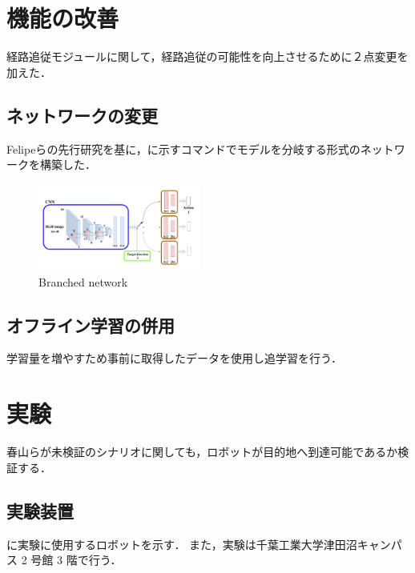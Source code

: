 \documentclass[10pt]{jarticle}
\begin{document}
    \section{機能の改善}%
    経路追従モジュールに関して，経路追従の可能性を向上させるために２点変更を加えた．
    \subsection{ネットワークの変更}
    Felipeら\cite{Codevilla2018}の先行研究を基に，に示すコマンドでモデルを分岐する形式のネットワークを構築した．
    \vspace{-2zh}
    \begin{center}
        \begin{figure}[h]
            \includegraphics[width=0.475\textwidth]{./fig/ishiguro/branched.pdf}
            \vspace{-2zh}
            \caption{Branched network}
            \label{fig:branched}
        \end{figure}
    \end{center}
    \vspace{-2zh}
    \subsection{オフライン学習の併用}
    学習量を増やすため事前に取得したデータを使用し追学習を行う．

    \section{実験}%
    春山らが未検証のシナリオに関しても，ロボットが目的地へ到達可能であるか検証する．
    \subsection{実験装置}
    に実験に使用するロボットを示す．
    また，実験は千葉工業大学津田沼キャンパス 2 号館 3 階で行う．
    
\end{document}

